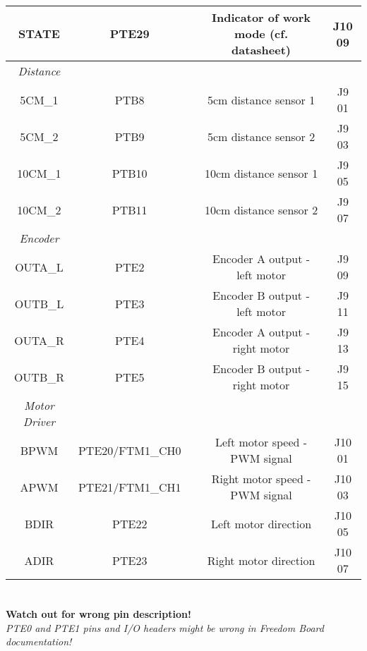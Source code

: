 \documentclass[10pt,a4paper]{article}
\begin{document}
\begin{tabular}{|c|c|c|c|c|}
\hline STATE & PTE29 & & Indicator of work mode (cf. datasheet) & J10 09 \\
\hline \emph{Distance} &  &  &  & \\ 
\hline 5CM\_1 & PTB8 &  & 5cm distance sensor 1 & J9 01 \\ 
\hline 5CM\_2 & PTB9 &  & 5cm distance sensor 2 & J9 03 \\ 
\hline 10CM\_1 & PTB10 &  & 10cm distance sensor 1 & J9 05 \\ 
\hline 10CM\_2 & PTB11 &  & 10cm distance sensor 2 & J9 07 \\ 
\hline \emph{Encoder} &  &  &  & \\ 
\hline OUTA\_L & PTE2 &  & Encoder A output - left motor & J9 09 \\ 
\hline OUTB\_L & PTE3 &  & Encoder B output - left motor & J9 11 \\ 
\hline OUTA\_R & PTE4 &  & Encoder A output - right motor & J9 13 \\ 
\hline OUTB\_R & PTE5 &  & Encoder B output - right motor & J9 15 \\ 
\hline \emph{Motor Driver}  &  &  &  & \\ 
\hline BPWM & PTE20/FTM1\_CH0 &  & Left motor speed - PWM signal & J10 01 \\ 
\hline APWM & PTE21/FTM1\_CH1 &  & Right motor speed - PWM signal & J10 03 \\ 
\hline BDIR & PTE22 &  & Left motor direction & J10 05 \\ 
\hline ADIR & PTE23 &  & Right motor direction & J10 07 \\ 
\hline 
\end{tabular} 

\section*{}
\centering
\textbf{Watch out for wrong pin description!} \\
\emph{PTE0 and PTE1 pins and I/O headers might be wrong in Freedom Board documentation!}
\end{document}

